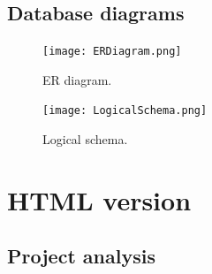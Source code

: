 \documentclass[a4paper,12pt]{article}
\begin{document}
\newpage
\subsection{Database diagrams}
\begin{figure}[h]
    \centering
    \texttt{[image: ERDiagram.png]}
    \caption{ER diagram.}
    \label{fig:ERDiagram}
\end{figure}
    
\begin{figure}[h]
    \centering
    \texttt{[image: LogicalSchema.png]}
    \caption{Logical schema.}
    \label{fig:LogicalSchema}
\end{figure}
\newpage

\section{HTML version}
\subsection{Project analysis}
\end{document}
